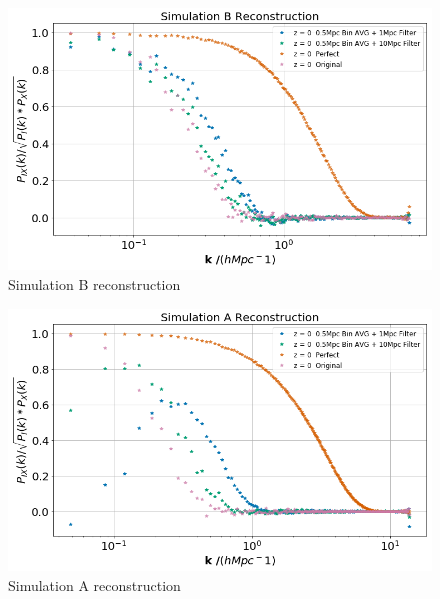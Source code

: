 \begin{figure}
    \centering
    \includegraphics[width=1\columnwidth]{images/realRecon/simBRecon.png}%
    
    \caption{
        Simulation B reconstruction
    }
    
    \label{fig:11}
\end{figure}

\begin{figure}
    \centering
    \includegraphics[width=1\columnwidth]{images/realRecon/simARecon.png}%
    
    \caption{
        Simulation A reconstruction
    }
    
    \label{fig:12}
\end{figure}